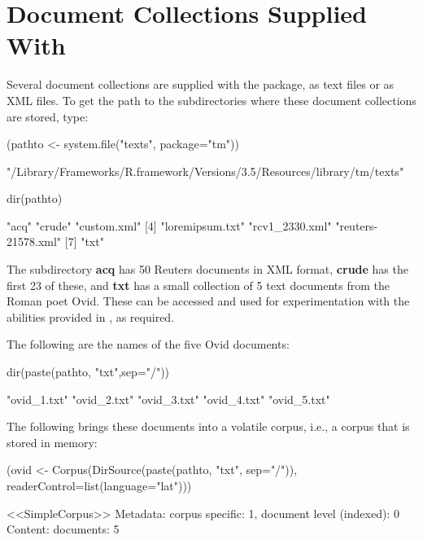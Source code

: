 \section{Document Collections Supplied With }
Several document collections are supplied with the package,
as text files or as XML files.  To get the path to the
subdirectories where these document collections are stored, 
type:
\begin{fullwidth}

\begin{Schunk}
\begin{Sinput}
(pathto <- system.file("texts", package="tm"))
\end{Sinput}
\begin{Soutput}
[1] "/Library/Frameworks/R.framework/Versions/3.5/Resources/library/tm/texts"
\end{Soutput}
\begin{Sinput}
dir(pathto)
\end{Sinput}
\begin{Soutput}
[1] "acq"               "crude"             "custom.xml"       
[4] "loremipsum.txt"    "rcv1_2330.xml"     "reuters-21578.xml"
[7] "txt"              
\end{Soutput}
\end{Schunk}

\end{fullwidth}
The subdirectory \textbf{acq} has 50 Reuters documents in XML format,
\textbf{crude} has the first 23 of these, and \textbf{txt} has a
small collection of 5 text documents from the Roman poet Ovid.
These can be accessed and used for experimentation with the abilities
provided in , as required.

The following are the names of the five Ovid documents:
\begin{fullwidth}

\begin{Schunk}
\begin{Sinput}
dir(paste(pathto, "txt",sep="/"))
\end{Sinput}
\begin{Soutput}
[1] "ovid_1.txt" "ovid_2.txt" "ovid_3.txt" "ovid_4.txt" "ovid_5.txt"
\end{Soutput}
\end{Schunk}

\end{fullwidth}

The following brings these documents into a volatile corpus, i.e.,
a corpus that is stored in memory:
\begin{Schunk}
\begin{Sinput}
(ovid <-
   Corpus(DirSource(paste(pathto, "txt", sep="/")),
          readerControl=list(language="lat")))
\end{Sinput}
\begin{Soutput}
<<SimpleCorpus>>
Metadata:  corpus specific: 1, document level (indexed): 0
Content:  documents: 5
\end{Soutput}
\end{Schunk}

